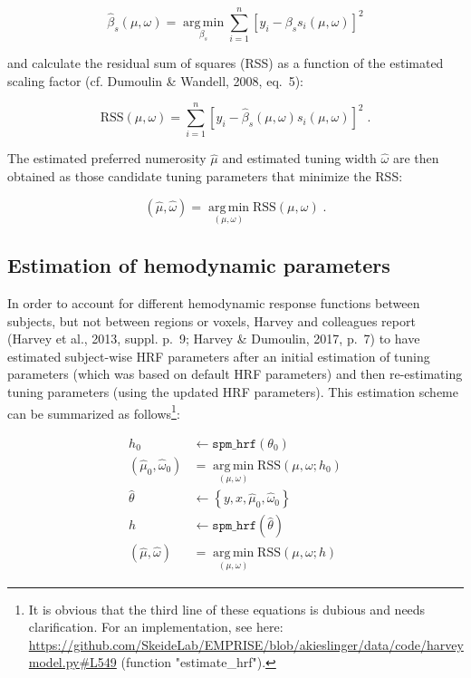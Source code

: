 \documentclass[a4paper,12pt]{article}
\begin{document}
\begin{equation} \label{eq:bs-est}
\hat{\beta}_s(\mu,\omega) = \operatorname*{arg\,min}_{\beta_s} \sum_{i=1}^{n} \left[ y_i - \beta_s s_i(\mu,\omega) \right]^2
\end{equation}

and calculate the residual sum of squares (RSS) as a function of the estimated scaling factor (cf. Dumoulin \& Wandell, 2008, eq.~5):

\begin{equation} \label{eq:RSS}
\mathrm{RSS}(\mu,\omega) = \sum_{i=1}^{n} \left[ y_i - \hat{\beta}_s(\mu,\omega) s_i(\mu,\omega) \right]^2 \; .
\end{equation}

The estimated preferred numerosity $\hat{\mu}$ and estimated tuning width $\hat{\omega}$ are then obtained as those candidate tuning parameters that minimize the RSS:

\begin{equation} \label{eq:mu-tw-est}
(\hat{\mu},\hat{\omega}) = \operatorname*{arg\,min}_{(\mu,\omega)} \mathrm{RSS}(\mu,\omega) \; .
\end{equation}


\subsection{Estimation of hemodynamic parameters}

In order to account for different hemodynamic response functions between subjects, but not between regions or voxels, Harvey and colleagues report (Harvey et al., 2013, suppl. p.~9; Harvey \& Dumoulin, 2017, p.~7) to have estimated subject-wise HRF parameters after an initial estimation of tuning parameters (which was based on default HRF parameters) and then re-estimating tuning parameters (using the updated HRF parameters). This estimation scheme can be summarized as follows\footnote{It is obvious that the third line of these equations is dubious and needs clarification. For an implementation, see here: \url{https://github.com/SkeideLab/EMPRISE/blob/akieslinger/data/code/harveymodel.py#L549} (function "estimate\_hrf").}:

\begin{equation} \label{eq:Harvey}
\begin{split}
h_0 &\leftarrow \mathtt{spm\_hrf}(\theta_0) \\
(\hat{\mu}_0,\hat{\omega}_0) &= \operatorname*{arg\,min}_{(\mu,\omega)} \mathrm{RSS}(\mu,\omega;h_0) \\
\hat{\theta} &\leftarrow \left\lbrace y, x, \hat{\mu}_0, \hat{\omega}_0 \right\rbrace \\
h &\leftarrow \mathtt{spm\_hrf}(\hat{\theta}) \\
(\hat{\mu},\hat{\omega}) &= \operatorname*{arg\,min}_{(\mu,\omega)} \mathrm{RSS}(\mu,\omega;h)
\end{split}
\end{equation}
\end{document}
